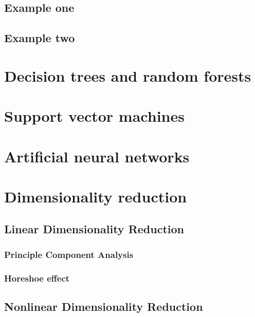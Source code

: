 \documentclass[]{book}
\theoremstyle{definition}
\theoremstyle{definition}
\theoremstyle{remark}
\begin{document}
\section{Example one}\label{example-one}

\section{Example two}\label{example-two}

\chapter{Decision trees and random
forests}\label{decision-trees-and-random-forests}

\chapter{Support vector machines}\label{support-vector-machines}

\chapter{Artificial neural networks}\label{artificial-neural-networks}

\chapter{Dimensionality reduction}\label{dimensionality-reduction}

\section{Linear Dimensionality
Reduction}\label{linear-dimensionality-reduction}

\subsection{Principle Component
Analysis}\label{principle-component-analysis}

\subsection{Horeshoe effect}\label{horeshoe-effect}

\section{Nonlinear Dimensionality
Reduction}\label{nonlinear-dimensionality-reduction}
\end{document}
